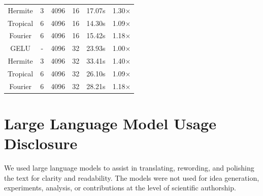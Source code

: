 \documentclass{article} %
\theoremstyle{plain}
\theoremstyle{definition}
\theoremstyle{remark}
\begin{document}
\begin{table}[!htbp]
\begin{center}
\begin{small}
\begin{tabular}{cccccc}
 Hermite      & 3        &    4096 &      16 & 17.07s          & 1.30×                  \\
 Tropical     & 6        &    4096 &      16 & 14.30s          & 1.09×                  \\
 Fourier      & 6        &    4096 &      16 & 15.42s          & 1.18×                  \\
 \midrule
 GELU         & -        &    4096 &      32 & 23.93s          & 1.00×                  \\
 Hermite      & 3        &    4096 &      32 & 33.41s          & 1.40×                  \\
 Tropical     & 6        &    4096 &      32 & 26.10s          & 1.09×                  \\
 Fourier      & 6        &    4096 &      32 & 28.21s          & 1.18×                  \\
\bottomrule
\end{tabular}
\end{small}
\end{center}
\vskip -0.1in
\end{table}
\newpage
\section{Large Language Model Usage Disclosure}
\label{appendix:disclosure}
We used large language models to assist in translating, rewording, and polishing the text for clarity and readability. The models were not used for idea generation, experiments, analysis, or contributions at the level of scientific authorship.
\end{document}
